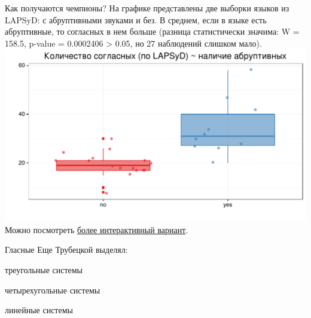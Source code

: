 \begin{frame}{Как получаются чемпионы?}
На графике представлены две выборки языков из LAPSyD: с абруптивными звуками и без. В среднем, если в языке есть абруптивные, то согласных в нем больше (разница статистически значима: W = 158.5, p-value = 0.0002406 > 0.05, но 27 наблюдений слишком мало).
\includegraphics[width=0.90\linewidth]{ejectives.pdf}\\
\vspace{-6mm} Можно посмотреть \href{http://goo.gl/JgrU6g}{\alert{более интерактивный вариант}}.
\end{frame}

\begin{frame}{Гласные}
Еще Трубецкой выделял:
\begin{itemize}
\mytem треугольные системы
\footnotesize
\begin{vowel}[plain]
\end{vowel}
\normalsize
\footnotesize
\begin{vowel}[plain]
\end{vowel}
\normalsize
\mytem четырехугольные системы
\footnotesize
\begin{vowel}[plain]
\end{vowel}
\normalsize
\mytem линейные системы
\footnotesize
\begin{vowel}[plain]
\end{vowel}
\normalsize
\end{itemize}
\end{frame}

